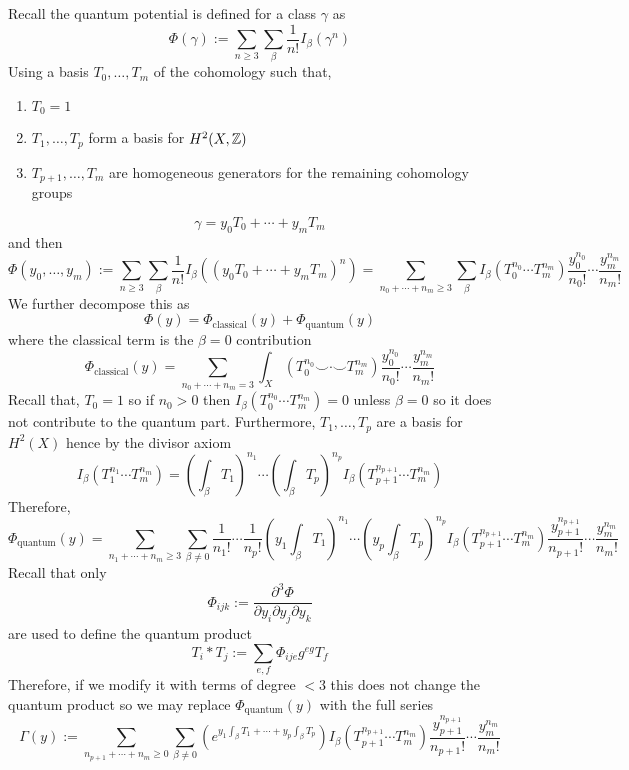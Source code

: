 \documentclass[12pt]{article}
\begin{document}
Recall the quantum potential is defined for a class $\gamma$ as
\[ \Phi(\gamma) := \sum_{n \ge 3} \sum_\beta \frac{1}{n!} I_\beta(\gamma^n) \]
Using a basis $T_0, \dots, T_m$ of the cohomology such that,
\begin{enumerate}
\item $T_0 = 1$
\item $T_1, \dots, T_p$ form a basis for $H^2(X, \mathbb{Z})$
\item $T_{p+1}, \dots, T_m$ are homogeneous generators for the remaining cohomology groups
\end{enumerate}
\[ \gamma = y_0 T_0 + \cdots + y_m T_m \]
and then
\[ \Phi(y_0, \dots, y_m) := \sum_{n \ge 3} \sum_\beta \frac{1}{n!} I_\beta((y_0 T_0 + \cdots + y_m T_m)^n) = \sum_{n_0 + \cdots + n_m \ge 3} \sum_\beta I_\beta(T_0^{n_0} \cdots T_m^{n_m}) \frac{y_0^{n_0}}{n_0!} \cdots \frac{y_m^{n_m}}{n_m!} \]
We further decompose this as 
\[ \Phi(y) = \Phi_{\text{classical}}(y) + \Phi_{\text{quantum}}(y) \]
where the classical term is the $\beta = 0$ contribution
\[ \Phi_{\text{classical}}(y) = \sum_{n_0 + \cdots + n_m = 3} \int_X (T_0^{n_0} \smile \cdot \smile T_m^{n_m}) \frac{y_0^{n_0}}{n_0!} \cdots \frac{y_m^{n_m}}{n_m!} \]
Recall that, $T_0 = 1$ so if $n_0 > 0$ then $I_\beta(T_0^{n_0} \cdots T_m^{n_m}) = 0$ unless $\beta = 0$ so it does not contribute to the quantum part. Furthermore, $T_1, \dots, T_p$ are a basis for $H^2(X)$ hence by the divisor axiom
\[ I_\beta(T_1^{n_1} \cdots T_m^{n_m}) = \left( \int_\beta T_1 \right)^{n_1} \cdots \left( \int_{\beta} T_p \right)^{n_p} I_{\beta}(T_{p+1}^{n_{p+1}} \cdots T_m^{n_m}) \] 
Therefore, 
\[ \Phi_{\text{quantum}}(y) = \sum_{n_{1} + \cdots + n_m \ge 3} \sum_{\beta \neq 0} \frac{1}{n_1!} \cdots \frac{1}{n_p!} \left( y_1 \int_\beta T_1 \right)^{n_1} \cdots \left( y_p \int_{\beta} T_p \right)^{n_p}  I_{\beta}(T_{p+1}^{n_{p+1}} \cdots T_m^{n_m}) \frac{y_{p+1}^{n_{p+1}}}{n_{p+1}!} \cdots \frac{y_m^{n_m}}{n_m!} \]
Recall that only
\[ \Phi_{ijk} := \frac{\partial^3 \Phi}{\partial y_i \partial y_j \partial y_k} \]
are used to define the quantum product
\[ T_i * T_j := \sum_{e,f} \Phi_{ije} g^{eg} T_f \]
Therefore, if we modify it with terms of degree $< 3$ this does not change the quantum product so we may replace $\Phi_{\text{quantum}}(y)$ with the full series
\[ \Gamma(y) := \sum_{n_{p+1} + \cdots + n_m \ge 0} \sum_{\beta \neq 0} \left( e^{y_1 \int_\beta T_1 + \cdots + y_p \int_\beta T_p} \right) I_{\beta}(T_{p+1}^{n_{p+1}} \cdots T_m^{n_m}) \frac{y_{p+1}^{n_{p+1}}}{n_{p+1}!} \cdots \frac{y_m^{n_m}}{n_m!} \]
\end{document}
